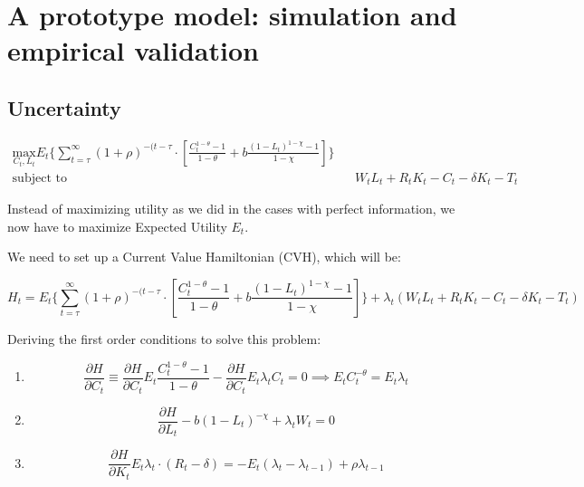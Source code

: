 \section{A prototype model: simulation and empirical validation}


\subsection{Uncertainty}

\begin{equation*}
\begin{aligned}
    \underset{C_t, L_t}{\text{max}}   E_t \Bigg\{ \sum^{\infty}_{t = \tau} \left( 1 + \rho \right)^{- (t - \tau} \cdot \left[  \frac{C_t^{1 - \theta} -1}{1 - \theta} + b \frac{(1 - L_t)^{1 - \chi} - 1}{1 - \chi} \right] \Bigg\} \\
   \text{subject to} && W_tL_t + R_tK_t - C_t - \delta K_t - T_t
\end{aligned}
\end{equation*}

Instead of maximizing utility as we did in the cases with perfect information, we now have to maximize Expected Utility $E_t$.



We need to set up a Current Value Hamiltonian (CVH), which will be:

$$
H_t = E_t \Bigg\{ \sum^{\infty}_{t = \tau} \left( 1 + \rho \right)^{- (t - \tau} \cdot \left[  \frac{C_t^{1 - \theta} -1}{1 - \theta} + b \frac{(1 - L_t)^{1 - \chi} - 1}{1 - \chi} \right] \Bigg\} + \lambda_t \left( W_tL_t + R_tK_t - C_t - \delta K_t - T_t \right)
$$

Deriving the first order conditions to solve this problem:

\begin{enumerate}[(1)]
    \item $$\frac{\partial H}{\partial C_t} \equiv \frac{\partial H}{\partial C_t} E_t \frac{C_t^{1 - \theta} - 1}{1 - \theta} - \frac{\partial H}{\partial C_t} E_t \lambda_t C_t = 0 \implies E_t C_t^{- \theta} = E_t \lambda_t $$
    
    \item $$\frac{\partial H}{\partial L_t} -b \left( 1 - L_t \right)^{ - \chi} + \lambda_t W_t = 0$$
    
        \item $$\frac{\partial H}{\partial K_t} E_t \lambda_t \cdot ( R_t - \delta ) = - E_t (\lambda_t - \lambda_{t - 1}) + \rho \lambda_{t - 1} $$

\end{enumerate}



